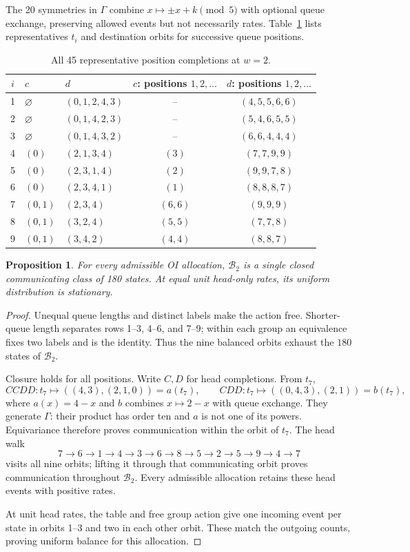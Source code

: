 \documentclass[11pt]{article}
\newtheorem{proposition}[theorem]{Proposition}
\theoremstyle{remark}
\newcommand{\emptyq}{\varnothing}
\begin{document}
The 20 symmetries in $\Gamma$ combine $x\mapsto\pm x+k\pmod5$ with optional queue exchange, preserving allowed events but not necessarily rates. Table~\ref{tab:orbits} lists representatives $t_i$ and destination orbits for successive queue positions.
\begin{table}[ht]
\centering\small
\renewcommand{\arraystretch}{1.12}
\begin{tabular}{cllcc}
\toprule
$i$&$c$&$d$&$c$: positions $1,2,\ldots$&$d$: positions $1,2,\ldots$\\
\midrule
1&$\emptyq$&$(0,1,2,4,3)$&--&$(4,5,5,6,6)$\\
2&$\emptyq$&$(0,1,4,2,3)$&--&$(5,4,6,5,5)$\\
3&$\emptyq$&$(0,1,4,3,2)$&--&$(6,6,4,4,4)$\\
4&$(0)$&$(2,1,3,4)$&$(3)$&$(7,7,9,9)$\\
5&$(0)$&$(2,3,1,4)$&$(2)$&$(9,9,7,8)$\\
6&$(0)$&$(2,3,4,1)$&$(1)$&$(8,8,8,7)$\\
7&$(0,1)$&$(2,3,4)$&$(6,6)$&$(9,9,9)$\\
8&$(0,1)$&$(3,2,4)$&$(5,5)$&$(7,7,8)$\\
9&$(0,1)$&$(3,4,2)$&$(4,4)$&$(8,8,7)$\\
\bottomrule
\end{tabular}
\caption{All 45 representative position completions at $w=2$.}\label{tab:orbits}
\end{table}

\begin{proposition}\label{prop:heads}
For every admissible OI allocation, $\mathcal B_2$ is a single closed communicating class of 180 states. At equal unit head-only rates, its uniform distribution is stationary.
\end{proposition}
\begin{proof}
Unequal queue lengths and distinct labels make the action free. Shorter-queue length separates rows 1--3, 4--6, and 7--9; within each group an equivalence fixes two labels and is the identity. Thus the nine balanced orbits exhaust the $180$ states of $\mathcal B_2$.

Closure holds for all positions. Write $C,D$ for head completions. From $t_7$,
\[
 CCDD:t_7\longmapsto((4,3),(2,1,0))=a(t_7),\qquad
 CDD:t_7\longmapsto((0,4,3),(2,1))=b(t_7),
\]
where $a(x)=4-x$ and $b$ combines $x\mapsto2-x$ with queue exchange. They generate $\Gamma$: their product has order ten and $a$ is not one of its powers. Equivariance therefore proves communication within the orbit of $t_7$. The head walk
\[
 7\to6\to1\to4\to3\to6\to8\to5\to2\to5\to9\to4\to7
\]
visits all nine orbits; lifting it through that communicating orbit proves communication throughout $\mathcal B_2$. Every admissible allocation retains these head events with positive rates.

At unit head rates, the table and free group action give one incoming event per state in orbits 1--3 and two in each other orbit. These match the outgoing counts, proving uniform balance for this allocation.
\end{proof}
\end{document}
